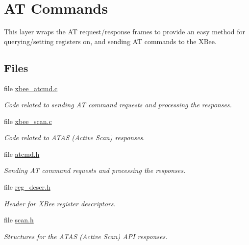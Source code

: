 \hypertarget{group__xbee__atcmd}{}\section{AT Commands}
\label{group__xbee__atcmd}


This layer wraps the AT request/response frames to provide an easy method for querying/setting registers on, and sending AT commands to the X\+Bee.  


\subsection*{Files}
\begin{DoxyCompactItemize}
\item 
file \hyperlink{xbee__atcmd_8c}{xbee\+\_\+atcmd.\+c}
\begin{DoxyCompactList}\small\item\em Code related to sending AT command requests and processing the responses. \end{DoxyCompactList}\item 
file \hyperlink{xbee__scan_8c}{xbee\+\_\+scan.\+c}
\begin{DoxyCompactList}\small\item\em Code related to A\+T\+AS (Active Scan) responses. \end{DoxyCompactList}\item 
file \hyperlink{atcmd_8h}{atcmd.\+h}
\begin{DoxyCompactList}\small\item\em Sending AT command requests and processing the responses. \end{DoxyCompactList}\item 
file \hyperlink{reg__descr_8h}{reg\+\_\+descr.\+h}
\begin{DoxyCompactList}\small\item\em Header for X\+Bee register descriptors. \end{DoxyCompactList}\item 
file \hyperlink{scan_8h}{scan.\+h}
\begin{DoxyCompactList}\small\item\em Structures for the A\+T\+AS (Active Scan) A\+PI responses. \end{DoxyCompactList}\end{DoxyCompactItemize}
